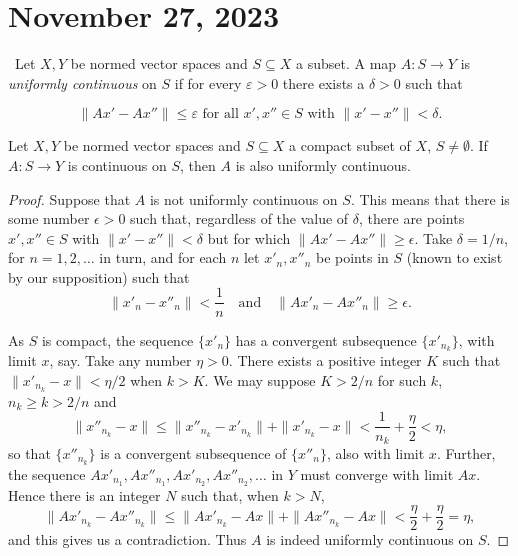 \newpage
\section{November 27, 2023}

\begin{definition}
    \ Let \( X, Y \) be normed vector spaces and \( S \subseteq X \) a subset. A map \( A: S \to Y \) is \emph{uniformly continuous} on \( S \) if for every \( \varepsilon > 0 \) there exists a \( \delta > 0 \) such that 

    \[ \|A x' - A x''\| \leq \varepsilon \text{ for all } x', x'' \in S \text{ with } \|x' - x''\| < \delta. \]
\end{definition}

\begin{theorem}
Let \( X, Y \) be normed vector spaces and \( S \subseteq X \) a compact subset of \( X \), \( S \neq \emptyset \). If \( A: S \to Y \) is continuous on \( S \), then \( A \) is also uniformly continuous.
\end{theorem}

\begin{proof}
Suppose that \( A \) is not uniformly continuous on \( S \). This means that there is some number \( \epsilon > 0 \) such that, regardless of the value of \( \delta \), there are points \( x', x'' \in S \) with \( \|x' - x''\| < \delta \) but for which \( \|Ax' - Ax''\| \geq \epsilon \). Take \( \delta = 1/n \), for \( n = 1, 2, \ldots \) in turn, and for each \( n \) let \( x'_n, x''_n \) be points in \( S \) (known to exist by our supposition) such that
\[
\|x'_n - x''_n\| < \frac{1}{n} \quad \text{and} \quad \|Ax'_n - Ax''_n\| \geq \epsilon.
\]

As \( S \) is compact, the sequence \( \{x'_n\} \) has a convergent subsequence \( \{x'_{n_k}\} \), with limit \( x \), say. Take any number \( \eta > 0 \). There exists a positive integer \( K \) such that \( \|x'_{n_k} - x\| < \eta/2 \) when \( k > K \). We may suppose \( K > 2/n \) for such \( k \), \( n_k \geq k > 2/n \) and
\[
\|x''_{n_k} - x\| \leq \|x''_{n_k} - x'_{n_k}\| + \|x'_{n_k} - x\| < \frac{1}{n_k} + \frac{\eta}{2} < \eta,
\]
so that \( \{x''_{n_k}\} \) is a convergent subsequence of \( \{x''_n\} \), also with limit \( x \). Further, the sequence \( Ax'_{n_1}, Ax''_{n_1}, Ax'_{n_2}, Ax''_{n_2}, \ldots \) in \( Y \) must converge with limit \( Ax \). Hence there is an integer \( N \) such that, when \( k > N \),
\[
\|Ax'_{n_k} - Ax''_{n_k}\| \leq \|Ax'_{n_k} - Ax\| + \|Ax''_{n_k} - Ax\| < \frac{\eta}{2} + \frac{\eta}{2} = \eta,
\]
and this gives us a contradiction. Thus \( A \) is indeed uniformly continuous on \( S \).
\end{proof}

